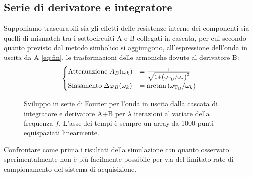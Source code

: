 \documentclass{article}[a4paper, oneside ,11pt]
\begin{document}
\subsection{Serie di derivatore e integratore}
Supponiamo trascurabili sia gli effetti delle resistenze interne dei componenti sia quelli di mismatch tra i sottocircuiti A e B collegati in cascata, per cui secondo quanto previsto dal metodo simbolico si aggiungono, all'espressione dell'onda in uscita da A \eqref{eq:fin}, le trasformazioni delle armoniche dovute al derivatore B:
\begin{align}
\begin{cases}
\mathrm{Attenuazione} \; A_B(\omega_k) &=  \frac{1}{\sqrt{1 + \left(\omega_{\rm T_B}/\omega_k \right)^2}} \\
\mathrm{Sfasamento} \; \Delta \phi_B(\omega_k) &= \arctan{\left(\omega_{\rm T_B} /\omega_k \right)} 
\end{cases}
\end{align}

\begin{figure}[!htb]
	\scalebox{0.55}{}\hfill \scalebox{0.55}{}
	\scalebox{0.55}{}\hfill \scalebox{0.55}{}
 	\caption{Sviluppo in serie di Fourier per l'onda in uscita dalla cascata di integratore e derivatore A+B per $\lambda$ iterazioni al variare della frequenza $f$. L'asse dei tempi è sempre un array da 1000 punti equispaziati linearmente. \label{plt:cas}}
\end{figure}
Confrontare come prima i risultati della simulazione con quanto osservato
sperimentalmente non è più facilmente possibile per via del limitato rate di
campionamento del sistema di acquisizione.
\end{document}
